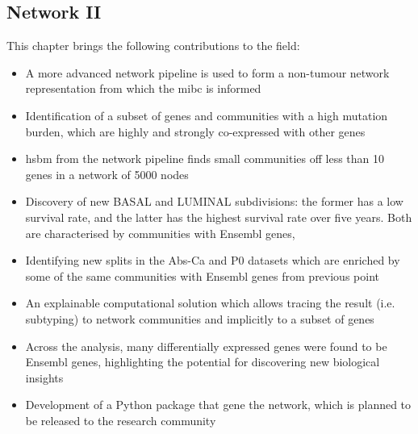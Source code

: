 \subsection*{Network II}

This chapter brings the following contributions to the field:
\begin{itemize}
    \item A more advanced network pipeline is used to form a non-tumour network representation from which the \acrshort{mibc} is informed
    \item Identification of a subset of genes and communities with a high mutation burden, which are highly and strongly co-expressed with other genes
    \item \acrfull{hsbm} from the network pipeline finds small communities off less than 10 genes in a network of 5000 nodes
    \item Discovery of new \gls{BASAL} and \gls{LUMINAL} subdivisions: the former has a low survival rate, and the latter has the highest survival rate over five years. Both are characterised by communities with Ensembl genes,
    \item Identifying new splits in the Abs-Ca and P0 datasets which are enriched by some of the same communities with Ensembl genes from previous point 
    \item An explainable computational solution which allows tracing the result (i.e. subtyping) to network communities and implicitly to a subset of genes
    \item Across the analysis, many differentially expressed genes were found to be Ensembl genes, highlighting the potential for discovering new biological insights
    \item Development of a Python package that gene the network, which is planned to be released to the research community
\end{itemize}